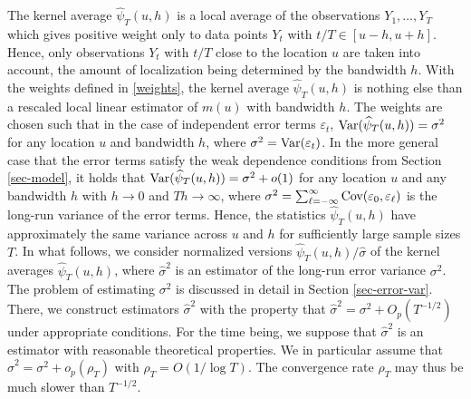 The kernel average $\widehat{\psi}_T(u,h)$ is a local average of the observations $Y_1,\ldots,Y_T$ which gives positive weight only to data points $Y_t$ with $t/T \in [u-h,u+h]$. Hence, only observations $Y_t$ with $t/T$ close to the location $u$ are taken into account, the amount of localization being determined by the bandwidth $h$. With the weights defined in \eqref{weights}, the kernel average $\widehat{\psi}_T(u,h)$ is nothing else than a rescaled local linear estimator of $m(u)$ with bandwidth $h$. The weights are chosen such that in the case of independent error terms $\varepsilon_t$, $\textnormal{Var}(\widehat{\psi}_T(u,h)) = \sigma^2$ for any location $u$ and bandwidth $h$, where $\sigma^2 = \textnormal{Var}(\varepsilon_t)$. In the more general case that the error terms satisfy the weak dependence conditions from Section \ref{sec-model}, it holds that $\textnormal{Var}(\widehat{\psi}_T(u,h)) = \sigma^2 + o(1)$ for any location $u$ and any bandwidth $h$ with $h \rightarrow 0$ and $Th \rightarrow \infty$, where $\sigma^2 = \sum\nolimits_{\ell=-\infty}^{\infty} \textnormal{Cov}(\varepsilon_0, \varepsilon_{\ell})$ is the long-run variance of the error terms. Hence, the statistics $\widehat{\psi}_T(u,h)$ have approximately the same variance across $u$ and $h$ for sufficiently large sample sizes $T$. In what follows, we consider normalized versions $\widehat{\psi}_T(u,h)/\widehat{\sigma}$ of the kernel averages $\widehat{\psi}_T(u,h)$, where $\widehat{\sigma}^2$ is an estimator of the long-run error variance $\sigma^2$. The problem of estimating $\sigma^2$ is discussed in detail in Section \ref{sec-error-var}. There, we construct estimators $\widehat{\sigma}^2$ with the property that $\widehat{\sigma}^2 = \sigma^2 + O_p(T^{-1/2})$ under appropriate conditions. For the time being, we suppose that $\widehat{\sigma}^2$ is an estimator with reasonable theoretical properties. We in particular assume that $\widehat{\sigma}^2 = \sigma^2 + o_p(\rho_T)$ with $\rho_T = O(1/\log T)$. The convergence rate $\rho_T$ may thus be much slower than $T^{-1/2}$. 


